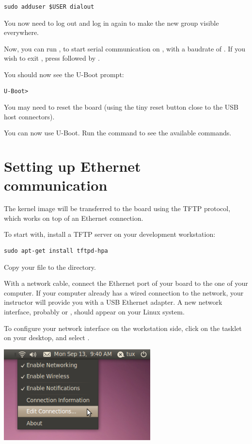 \begin{verbatim}
sudo adduser $USER dialout
\end{verbatim}

You now need to log out and log in again to make the new group
visible everywhere.

Now, you can run , to start serial
communication on , with a baudrate of . If
you wish to exit , press \code{[Ctrl][a]} followed by
\code{[Ctrl][x]}.

You should now see the U-Boot prompt:
\begin{verbatim}
U-Boot>
\end{verbatim}

You may need to reset the board (using the tiny reset button close to
the USB host connectors).

You can now use U-Boot. Run the  command to see the available
commands.

\section{Setting up Ethernet communication}

The kernel image will be transferred to the board using the TFTP
protocol, which works on top of an Ethernet connection.

To start with, install a TFTP server on your development workstation:

\begin{verbatim}
sudo apt-get install tftpd-hpa
\end{verbatim}

Copy your  file to the  directory.

With a network cable, connect the Ethernet port of your board to the
one of your computer. If your computer already has a wired connection
to the network, your instructor will provide you with a USB Ethernet
adapter. A new network interface, probably  or ,
should appear on your Linux system.

To configure your network interface on the workstation side, click on
the  tasklet on your desktop, and select
.

\begin{center}
\includegraphics[width=8cm]{labs/kernel-module-environment/network-config-1.png}
\end{center}


